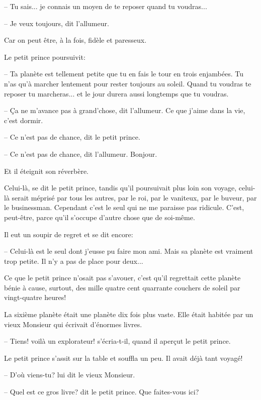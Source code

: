 \documentclass[a4paper]{report}
\begin{document}
-- Tu sais... je connais un moyen de te reposer quand tu voudras...

-- Je veux toujours, dit l'allumeur.

Car on peut être, à la fois, fidèle et paresseux.

Le petit prince poursuivit:

-- Ta planète est tellement petite que tu en fais le tour en trois enjambées. Tu n'as qu'à marcher lentement pour rester toujours au soleil. Quand tu voudras te reposer tu marcheras... et le jour durera aussi longtemps que tu voudras.

-- Ça ne m'avance pas à grand'chose, dit l'allumeur. Ce que j'aime dans la vie, c'est dormir.

-- Ce n'est pas de chance, dit le petit prince.

-- Ce n'est pas de chance, dit l'allumeur. Bonjour.

Et il éteignit son réverbère.

Celui-là, se dit le petit prince, tandis qu'il poursuivait plus loin son voyage, celui-là serait méprisé par tous les autres, par le roi, par le vaniteux, par le buveur, par le businessman. Cependant c'est le seul qui ne me paraisse pas ridicule. C'est, peut-être, parce qu'il s'occupe d'autre chose que de soi-même.

Il eut un soupir de regret et se dit encore:

-- Celui-là est le seul dont j'eusse pu faire mon ami. Mais sa planète est vraiment trop petite. Il n'y a pas de place pour deux...

Ce que le petit prince n'osait pas s'avouer, c'est qu'il regrettait cette planète bénie à cause, surtout, des mille quatre cent quarrante couchers de soleil par vingt-quatre heures!
\parachapter{} %

La sixième planète était une planète dix fois plus vaste. Elle était habitée par un vieux Monsieur qui écrivait d'énormes livres.

-- Tiens! voilà un explorateur! s'écria-t-il, quand il aperçut le petit prince.

Le petit prince s'assit sur la table et souffla un peu. Il avait déjà tant voyagé!


-- D'où viens-tu? lui dit le vieux Monsieur.

-- Quel est ce gros livre? dit le petit prince. Que faites-vous ici?
\end{document}
